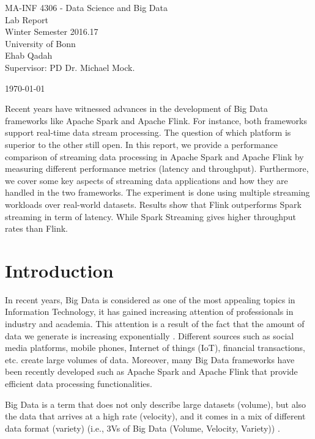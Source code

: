 \documentclass[]{article}
\begin{document}
\begin{flushleft}

\vspace{4pt}

\centering
 MA-INF 4306 - Data Science and Big Data \\
 Lab Report\\
 
   Winter Semester 2016.17\\

		 University of Bonn\\


\vspace{6pt}
\centering
 Ehab Qadah\\
 Supervisor: PD Dr. Michael Mock.
 \vspace{4pt}
 
 \today
\end{flushleft}


\begin{abstract}

\end{abstract}
Recent years have witnessed advances in the  development of Big Data frameworks like Apache Spark and Apache Flink. For instance, both frameworks support real-time data 
stream processing. The question of which platform is superior to the other still open. 
In this report, we provide a performance comparison of streaming data processing in Apache Spark and Apache Flink by measuring different performance metrics (latency and throughput). Furthermore, we cover some key aspects of streaming data applications and how they are handled in the two frameworks. The experiment is done using multiple streaming workloads over real-world datasets. Results show that Flink outperforms Spark streaming in term of latency. While Spark Streaming gives higher throughput rates than Flink. 
\section{Introduction}

\par In recent years, Big Data is considered as one of the most appealing topics in Information Technology, it has gained increasing attention of professionals in industry and academia. This attention is a result of the fact that the amount of data we generate is increasing exponentially \cite{idc}.  Different sources such as  social media platforms, mobile phones, Internet of things (IoT), financial transactions, etc.  create large volumes of data.  Moreover, many Big Data frameworks have been recently developed such as Apache Spark \cite{spark} and Apache Flink \cite{flink} that provide efficient data processing functionalities.
 \par Big Data is a term that does not only describe large datasets (volume), but also the data that arrives at a high rate (velocity), and it comes in a mix of different data format (variety) (i.e., 3Vs of Big Data (Volume, Velocity, Variety)) \cite{svs}.
\end{document}
